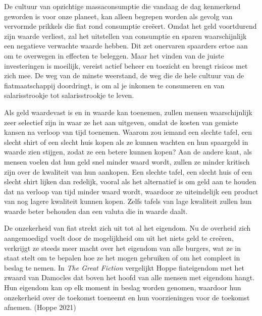 \documentclass[
  a5paper,
  smalldemyvopaper,11pt,twoside,onecolumn,openright,extrafontsizes,
hidelinks]{memoir}
\begin{document}
De cultuur van opzichtige massaconsumptie die vandaag de dag kenmerkend
geworden is voor onze planeet, kan alleen begrepen worden als gevolg van
vervormde prikkels die fiat rond consumptie creëert. Omdat het geld
voortdurend zijn waarde verliest, zal het uitstellen van consumptie en
sparen waarschijnlijk een negatieve verwachte waarde hebben. Dit zet
onervaren spaarders ertoe aan om te overwegen in effecten te beleggen.
Maar het vinden van de juiste investeringen is moeilijk, vereist actief
beheer en toezicht en brengt risicos met zich mee. De weg van de minste
weerstand, de weg die de hele cultuur van de fiatmaatschappij
doordringt, is om al je inkomen te consumeren en van salarisstrookje tot
salarisstrookje te leven.

Als geld waardevast is en in waarde kan toenemen, zullen mensen
waarschijnlijk zeer selectief zijn in waar ze het aan uitgeven, omdat de
kosten van gemiste kansen na verloop van tijd toenemen. Waarom zou
iemand een slechte tafel, een slecht shirt of een slecht huis kopen als
ze kunnen wachten en hun spaargeld in waarde zien stijgen, zodat ze een
betere kunnen kopen? Aan de andere kant, als mensen voelen dat hun geld
snel minder waard wordt, zullen ze minder kritisch zijn over de
kwaliteit van hun aankopen. Een slechte tafel, een slecht huis of een
slecht shirt lijken dan redelijk, vooral als het alternatief is om geld
aan te houden dat na verloop van tijd minder waard wordt, waardoor ze
uiteindelijk een product van nog lagere kwaliteit kunnen kopen. Zelfs
tafels van lage kwaliteit zullen hun waarde beter behouden dan een
valuta die in waarde daalt.

De onzekerheid van fiat strekt zich uit tot al het eigendom. Nu de
overheid zich aangemoedigd voelt door de mogelijkheid om uit het niets
geld te creëren, verkrijgt ze steeds meer macht over het eigendom van
alle burgers, wat ze in staat stelt om te bepalen hoe ze het mogen
gebruiken of om het compleet in beslag te nemen. In \emph{The Great
Fiction} vergelijkt Hoppe fiateigendom met het zwaard van Damocles dat
boven het hoofd van alle mensen met eigendom hangt. Hun eigendom kan op
elk moment in beslag worden genomen, waardoor hun onzekerheid over de
toekomst toeneemt en hun voorzieningen voor de toekomst afnemen. (Hoppe
2021)
\end{document}
